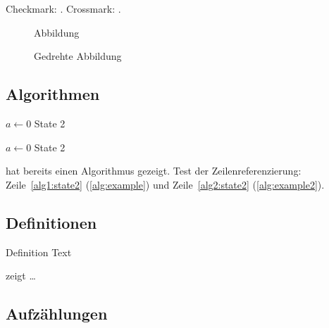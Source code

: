 \begin{ltgexample}
Checkmark: \dingcheck.
Crossmark: \dingcross.
\end{ltgexample}

\begin{figure}
  \missingfigure{}
  \caption{Abbildung}
  \label{fig:Abbildung}
\end{figure}

\begin{landscape}
  \begin{figure}
    \missingfigure{}
    \caption{Gedrehte Abbildung}
    \label{fig:AbbildungGedreht}
  \end{figure}
\end{landscape}

\subsection{Algorithmen}

\begin{algorithm}
  \caption{$algo$}
  \label{alg:example}
  \begin{algorithmic}[1]
    \State $a \gets 0$
    \State State 2\label{alg1:state2}
  \end{algorithmic}
\end{algorithm}

\begin{algorithm}
  \caption{Algorithmus 2}
  \label{alg:example2}
  \begin{algorithmic}[1]
    \State $a \gets 0$
    \State State 2\label{alg2:state2}
  \end{algorithmic}
\end{algorithm}

 hat bereits einen Algorithmus gezeigt.
Test der Zeilenreferenzierung: Zeile~\ref{alg1:state2} (\cref{alg:example}) und Zeile~\ref{alg2:state2} (\cref{alg:example2}).

\subsection{Definitionen}
\begin{definition}[Title]
  \label{def:def1}
  Definition Text
\end{definition}

 zeigt \ldots

\subsection{Aufzählungen}

